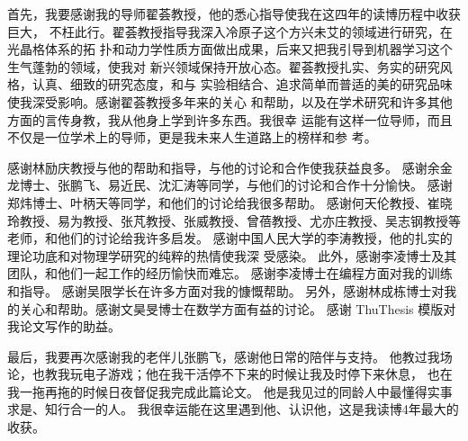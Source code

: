 \begin{acknowledgement}

首先，我要感谢我的导师翟荟教授，他的悉心指导使我在这四年的读博历程中收获巨大，
不枉此行。翟荟教授指导我深入冷原子这个方兴未艾的领域进行研究，在光晶格体系的拓
扑和动力学性质方面做出成果，后来又把我引导到机器学习这个生气蓬勃的领域，使我对
新兴领域保持开放心态。翟荟教授扎实、务实的研究风格，认真、细致的研究态度，和与
实验相结合、追求简单而普适的美的研究品味使我深受影响。感谢翟荟教授多年来的关心
和帮助，以及在学术研究和许多其他方面的言传身教，我从他身上学到许多东西。我很幸
运能有这样一位导师，而且不仅是一位学术上的导师，更是我未来人生道路上的榜样和参
考。

感谢林励庆教授与他的帮助和指导，与他的讨论和合作使我获益良多。
感谢余金龙博士、张鹏飞、易近民、沈汇涛等同学，与他们的讨论和合作十分愉快。
感谢郑炜博士、叶柄天等同学，和他们的讨论给我很多帮助。
感谢何天伦教授、崔晓玲教授、易为教授、张芃教授、张威教授、曾蓓教授、尤亦庄教授、吴志钢教授等老师，和他们的讨论给我许多启发。
感谢中国人民大学的李涛教授，他的扎实的理论功底和对物理学研究的纯粹的热情使我深
受感染。
此外，感谢李凌博士及其团队，和他们一起工作的经历愉快而难忘。
感谢李凌博士在编程方面对我的训练和指导。
感谢吴限学长在许多方面对我的慷慨帮助。
另外，感谢林成栋博士对我的关心和帮助。感谢文昊旻博士在数学方面有益的讨论。
感谢 ThuThesis 模版对我论文写作的助益。

最后，我要再次感谢我的老伴儿张鹏飞，感谢他日常的陪伴与支持。
他教过我场论，也教我玩电子游戏；他在我干活停不下来的时候让我及时停下来休息，
也在我一拖再拖的时候日夜督促我完成此篇论文。
他是我见过的同龄人中最懂得实事求是、知行合一的人。
我很幸运能在这里遇到他、认识他，这是我读博4年最大的收获。

\end{acknowledgement}
